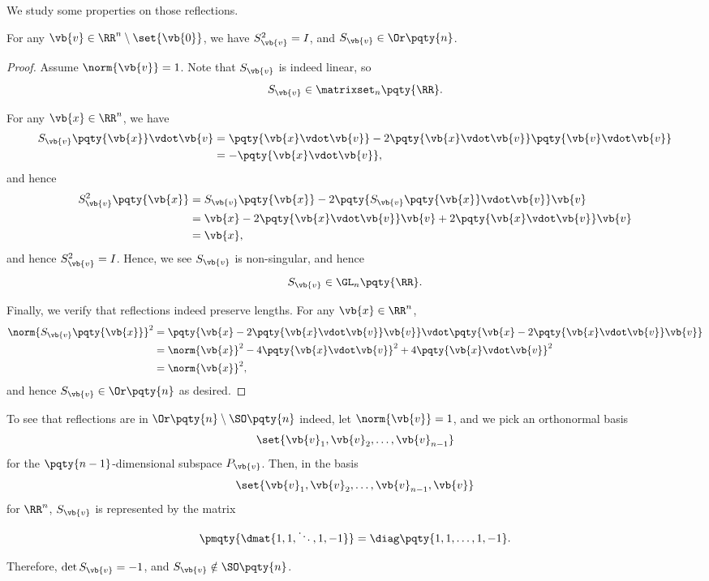 We study some properties on those reflections.

\begin{lemma}
    \label{lem:reflections-orthogonal-order-2}%
    For any \(\vb{v} \in \RR^n\setminus\set{\vb{0}}\), we have \(S_{\vb{v}}^2 = I\), and \(S_{\vb{v}} \in \Or\pqty{n}\).
\end{lemma}

\begin{proof}
    Assume \(\norm{\vb{v}} = 1\). Note that \(S_{\vb{v}}\) is indeed linear, so
    \[
        S_{\vb{v}} \in \matrixset_n \pqty{\RR}.
    \]

    For any \(\vb{x} \in \RR^n\), we have
    \begin{align*}
        S_{\vb{v}} \pqty{\vb{x}} \vdot \vb{v} &= \pqty{\vb{x} \vdot \vb{v}} - 2 \pqty{\vb{x} \vdot \vb{v}} \pqty{\vb{v} \vdot \vb{v}} \\
        &= - \pqty{\vb{x} \vdot \vb{v}},
    \end{align*}
    and hence
    \begin{align*}
        S_{\vb{v}}^2 \pqty{\vb{x}} &= S_{\vb{v}} \pqty{\vb{x}} - 2 \pqty{S_{\vb{v}} \pqty{\vb{x}} \vdot \vb{v}} \vb{v} \\
        &= \vb{x} - 2\pqty{\vb{x} \vdot \vb{v}} \vb{v} + 2 \pqty{\vb{x} \vdot \vb{v}} \vb{v} \\
        &= \vb{x},
    \end{align*}
    and hence \(S_{\vb{v}}^2 = I\). Hence, we see \(S_{\vb{v}}\) is non-singular, and hence
    \[
        S_{\vb{v}} \in \GL_n \pqty{\RR}.
    \]

    Finally, we verify that reflections indeed preserve lengths. For any \(\vb{x} \in \RR^n\),
    \begin{align*}
        \norm{S_{\vb{v}} \pqty{\vb{x}}}^2 &= \pqty{\vb{x} - 2 \pqty{\vb{x} \vdot \vb{v}} \vb{v}} \vdot \pqty{\vb{x} - 2 \pqty{\vb{x} \vdot \vb{v}} \vb{v}} \\
        &= \norm{\vb{x}}^2 - 4 \pqty{\vb{x} \vdot \vb{v}}^2 + 4 \pqty{\vb{x} \vdot \vb{v}}^2 \\
        &= \norm{\vb{x}}^2,
    \end{align*}
    and hence \(S_{\vb{v}} \in \Or\pqty{n}\) as desired.
\end{proof}

\begin{remark}
    To see that reflections are in \(\Or\pqty{n} \setminus \SO\pqty{n}\) indeed, let \(\norm{\vb{v}} = 1\), and we pick an orthonormal basis
    \[
        \set{\vb{v}_1, \vb{v}_2, \ldots, \vb{v}_{n - 1}}
    \]
    for the \(\pqty{n-1}\)-dimensional subspace \(P_{\vb{v}}\). Then, in the basis
    \[
        \set{\vb{v}_1, \vb{v}_2, \ldots, \vb{v}_{n - 1}, \vb{v}}
    \]
    for \(\RR^n\), \(S_{\vb{v}}\) is represented by the matrix
    \[
        \pmqty{\dmat{1, 1, \ddots, 1, -1}} = \diag\pqty{1, 1, \ldots, 1, -1}.
    \]

    Therefore, \(\det S_{\vb{v}} = -1\), and \(S_{\vb{v}} \notin \SO\pqty{n}\).
\end{remark}

